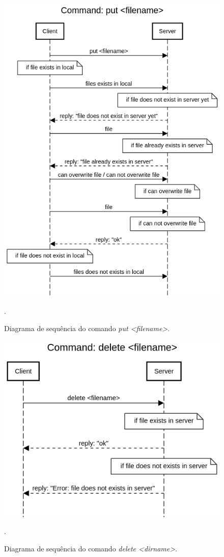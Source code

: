 \documentclass[conference]{IEEEtran}
\begin{document}
\begin{figure}[H]
\centering
\centerline{\includegraphics[scale=0.4]{diagrams/Command_put_filename.png}}
\caption{Diagrama de sequência do comando \textit{put <filename>}.}.
\label{put}
\end{figure}

\begin{figure}[H]
\centering
\centerline{\includegraphics[scale=0.4]{diagrams/Command_delete_filename.png}}
\caption{Diagrama de sequência do comando \textit{delete <dirname>}.}.
\label{delete}
\end{figure}
\end{document}

